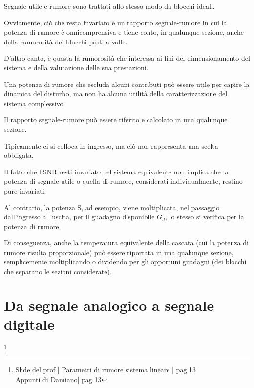 Segnale utile e rumore sono trattati allo stesso modo da blocchi ideali. \newline 

Ovviamente, ciò che resta invariato è un rapporto segnale-rumore in cui la potenza di rumore è onnicomprensiva e tiene conto, in qualunque sezione, anche della rumorosità dei blocchi posti a valle. \newline 

D'altro canto, è questa la rumorosità che interessa ai fini del dimensionamento del sistema e della valutazione delle sua prestazioni. \newline 

Una potenza di rumore che escluda alcuni contributi può essere utile per capire la dinamica del disturbo, 
ma non ha alcuna utilità della caratterizzazione del sistema complessivo. \newline 

Il rapporto segnale-rumore può essere riferito e calcolato in una qualunque sezione. \newline 

Tipicamente ci si colloca in ingresso, ma ciò non rappresenta una scelta obbligata. \newline 

Il fatto che l'SNR resti invariato nel sistema equivalente non implica che la potenza di segnale utile o quella di rumore, considerati individualmente, 
restino pure invariati. \newline 

Al contrario, la potenza S, ad esempio, viene moltiplicata, nel passaggio dall'ingresso all'uscita, per il guadagno disponibile $G_d$, 
lo stesso si verifica per la potenza di rumore. \newline 

Di conseguenza, anche la temperatura equivalente della cascata (cui la potenza di rumore risulta proporzionale) 
può essere riportata in una qualunque sezione, 
semplicemente moltiplicando o dividendo per gli opportuni guadagni (dei blocchi che separano le sezioni considerate). \newline 

\newpage 

\section{Da segnale analogico a segnale digitale}
\footnote{Slide del prof | Parametri di rumore sistema lineare | pag 13\\  
Appunti di Damiano| pag 13} 

